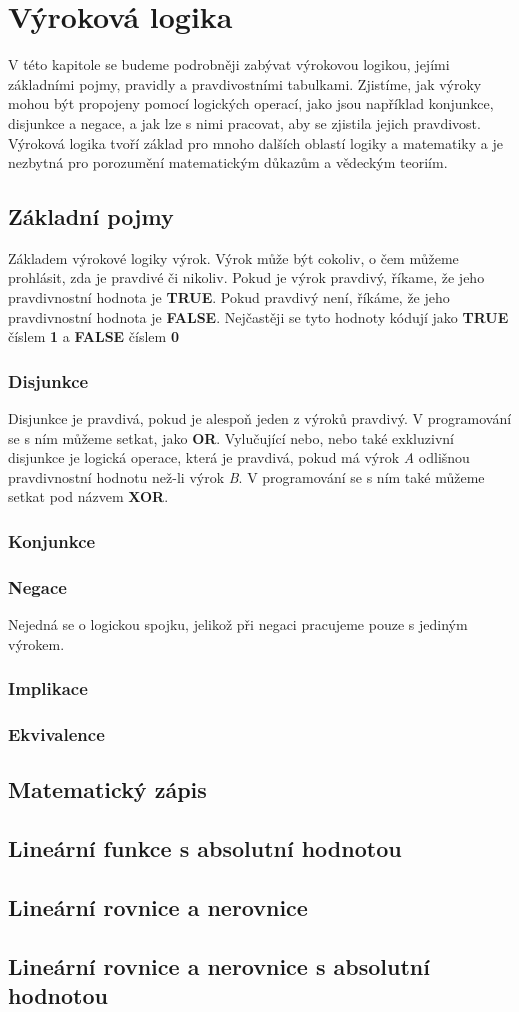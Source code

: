 
\newpage
\chapter{Výroková logika}
V této kapitole se budeme podrobněji zabývat výrokovou logikou, jejími základními pojmy, pravidly a pravdivostními tabulkami.
Zjistíme, jak výroky mohou být propojeny pomocí logických operací, jako jsou například konjunkce, disjunkce a negace, a jak
lze s nimi pracovat, aby se zjistila jejich pravdivost. Výroková logika tvoří základ pro mnoho dalších oblastí logiky a matematiky
a je nezbytná pro porozumění matematickým důkazům a vědeckým teoriím.
    \section{Základní pojmy}
Základem výrokové logiky výrok. Výrok může být cokoliv, o čem můžeme prohlásit, zda je pravdivé či nikoliv. Pokud je výrok pravdivý,
říkame, že jeho pravdivnostní hodnota je \textbf{TRUE}. Pokud pravdivý není, říkáme, že jeho pravdivnostní hodnota je \textbf{FALSE}.
Nejčastěji se tyto hodnoty kódují jako \textbf{TRUE} číslem \textbf{1} a \textbf{FALSE} číslem \textbf{0}
        \subsection{Disjunkce}
Disjunkce je pravdivá, pokud je alespoň jeden z výroků pravdivý. V programování se s ním můžeme setkat, jako \textbf{OR}. Vylučující nebo,
nebo také exkluzivní disjunkce je logická operace, která je pravdivá, pokud má výrok \emph{A} odlišnou pravdivnostní hodnotu než-li výrok
\emph{B}. V programování se s ním také můžeme setkat pod názvem \textbf{XOR}.

        \subsection{Konjunkce}

        \subsection{Negace }
Nejedná se o logickou spojku, jelikož při negaci pracujeme pouze s jediným výrokem.
        \subsection{Implikace}
        \subsection{Ekvivalence}

    \section{Matematický zápis}
    \section{Lineární funkce s absolutní hodnotou}
    \section{Lineární rovnice a nerovnice}
    \section{Lineární rovnice a nerovnice s absolutní hodnotou}



